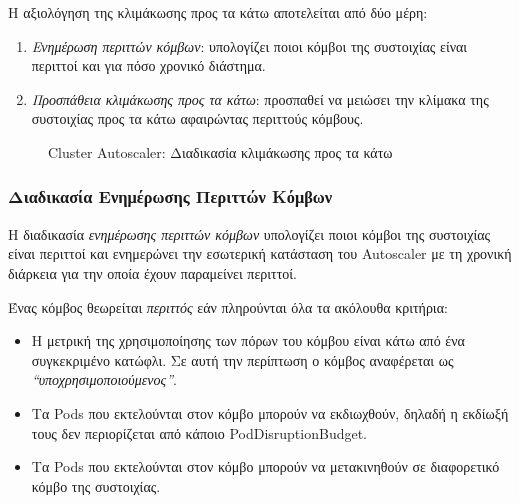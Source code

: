 Η αξιολόγηση της κλιμάκωσης προς τα κάτω αποτελείται από δύο μέρη:
\begin{enumerate}
      \tightlist
      \item \textit{Ενημέρωση περιττών κόμβων}:  υπολογίζει ποιοι κόμβοι της
            συστοιχίας είναι περιττοί και για πόσο χρονικό διάστημα.
      \item \textit{Προσπάθεια κλιμάκωσης προς τα κάτω}: προσπαθεί να μειώσει
            την κλίμακα της συστοιχίας προς τα κάτω αφαιρώντας περιττούς
            κόμβους.
\end{enumerate}

\begin{figure}[H]
      \centering
      \caption{Cluster Autoscaler: Διαδικασία κλιμάκωσης προς τα κάτω}
      \label{figure:gr-autoscaler-scale-down}
\end{figure}

\subsubsection{Διαδικασία Ενημέρωσης Περιττών Κόμβων}

Η διαδικασία \textit{ενημέρωσης περιττών κόμβων} υπολογίζει ποιοι κόμβοι της
συστοιχίας είναι περιττοί και ενημερώνει την εσωτερική κατάσταση του Autoscaler με τη
χρονική διάρκεια για την οποία έχουν παραμείνει περιττοί.

Ένας κόμβος θεωρείται \textit{περιττός} εάν πληρούνται όλα τα ακόλουθα κριτήρια:
\begin{itemize}
      \tightlist
      \item H μετρική της χρησιμοποίησης των πόρων του κόμβου είναι κάτω από ένα
            συγκεκριμένο κατώφλι. Σε αυτή την περίπτωση ο κόμβος αναφέρεται ως
            \textit{``υποχρησιμοποιούμενος''}.
      \item Τα Pods που εκτελούνται στον κόμβο μπορούν να εκδιωχθούν, δηλαδή η
            εκδίωξή τους δεν περιορίζεται από κάποιο PodDisruptionBudget.
      \item Τα Pods που εκτελούνται στον κόμβο μπορούν να μετακινηθούν σε
            διαφορετικό κόμβο της συστοιχίας.
\end{itemize}

